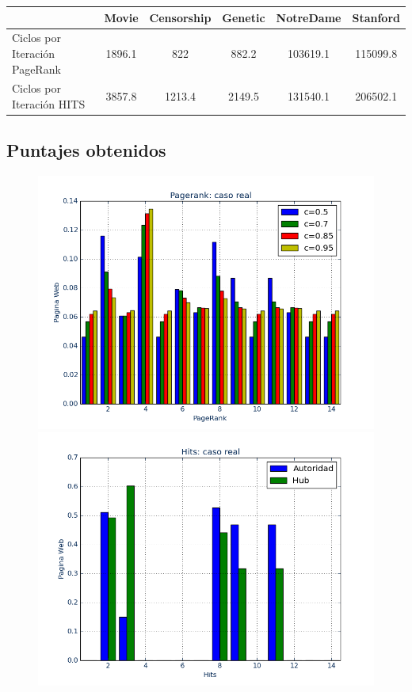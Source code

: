 \documentclass[a4paper]{article}
\begin{document}
\newpage
\begin{center}
\begin{tabular}{l|c|c|c|c|c}
\hline
& Movie & Censorship & Genetic & NotreDame & Stanford\\
\hline
Ciclos por Iteración PageRank & 1896.1 & 822 & 882.2 & 103619.1 & 115099.8 \\
\hline
Ciclos por Iteración HITS & 3857.8 & 1213.4 & 2149.5 & 131540.1 & 206502.1
\end{tabular}
\end{center}

\subsection{Puntajes obtenidos}

\begin{figure}[htbp]
\centering
\includegraphics[scale=0.25]{img/casorealPage.png}
\includegraphics[scale=0.25]{img/casorealHits.png}

\end{figure}
\end{document}
